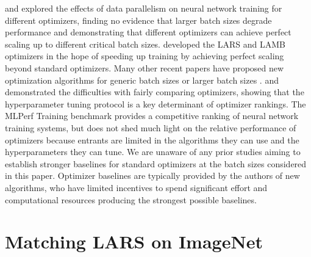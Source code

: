 \documentclass{article}
\begin{document}
\citet{shallue2019measuring} and \citet{zhang2019algorithmic} explored the effects of data parallelism on neural network training for different optimizers, finding no evidence that larger batch sizes degrade performance and demonstrating that different optimizers can achieve perfect scaling up to different critical batch sizes. \citet{you2017lars,you2019lamb} developed the LARS and LAMB optimizers  in the hope of speeding up training by achieving perfect scaling beyond standard optimizers. Many other recent papers have proposed new optimization algorithms for generic batch sizes or larger batch sizes \citep[see][]{schmidt2020descending}. \citet{choi2019empirical} and \citet{schmidt2020descending} demonstrated the difficulties with fairly comparing optimizers, showing that the hyperparameter tuning protocol is a key determinant of optimizer rankings. The MLPerf Training benchmark \citep{mattson2019mlperf} provides a competitive ranking of neural network training systems, but does not shed much light on the relative performance of optimizers because entrants are limited in the algorithms they can use and the hyperparameters they can tune. We are unaware of any prior studies aiming to establish stronger baselines for standard optimizers at the batch sizes considered in this paper. Optimizer baselines are typically provided by the authors of new algorithms, who have limited incentives to spend significant effort and computational resources producing the strongest possible baselines.


 \clearpage \section{Matching LARS on ImageNet}\label{sec:resnet50}
\end{document}
